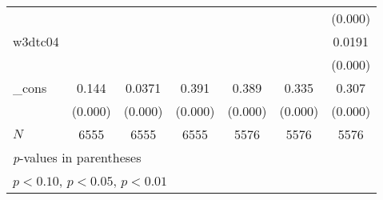 {\begin{tabular}{l*{6}{c}}
            &                     &                     &                     &                     &                     &     (0.000)         \\
[1em]
w3dtc04     &                     &                     &                     &                     &                     &      0.0191\sym{***}\\
            &                     &                     &                     &                     &                     &     (0.000)         \\
[1em]
\_cons      &       0.144\sym{***}&      0.0371\sym{***}&       0.391\sym{***}&       0.389\sym{***}&       0.335\sym{***}&       0.307\sym{***}\\
            &     (0.000)         &     (0.000)         &     (0.000)         &     (0.000)         &     (0.000)         &     (0.000)         \\
\hline
\(N\)       &        6555         &        6555         &        6555         &        5576         &        5576         &        5576         \\
\hline\hline
\multicolumn{7}{l}{\footnotesize \textit{p}-values in parentheses}\\
\multicolumn{7}{l}{\footnotesize \sym{*} \(p<0.10\), \sym{**} \(p<0.05\), \sym{***} \(p<0.01\)}\\
\end{tabular}
}
